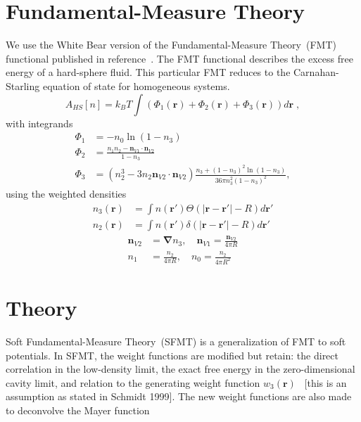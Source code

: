 \documentclass[letterpaper,twocolumn,amsmath,amssymb,prb]{revtex4-1}
\newcommand{\red}[1]{{\color{red} #1}}
\newcommand{\rr}{\textbf{r}}
\newcommand{\fixme}[1]{\red{[#1]}}
\begin{document}
\section{Fundamental-Measure Theory}

We use the White Bear version of the Fundamental-Measure Theory~(FMT)
functional published in reference~\cite{roth2002whitebear}.  The FMT
functional describes the excess free energy of a hard-sphere fluid.
This particular FMT reduces to the Carnahan-Starling equation of state
for homogeneous systems.
\begin{equation}
A_\textit{HS}[n] = k_B T \int \left(\Phi_1(\rr) + \Phi_2(\rr) + \Phi_3(\rr)\right) d\rr \; ,
\end{equation}
with integrands
\begin{align}
\Phi_1 &= -n_0 \ln\left( 1 - n_3\right)\\
\Phi_2 &= \frac{n_1 n_2 - \mathbf{n}_{V1} \cdot\mathbf{n}_{V2}}{1-n_3} \\
\Phi_3 &= (n_2^3 - 3 n_2 \mathbf{n}_{V2} \cdot \mathbf{n}_{V2}) \frac{
  n_3 + (1-n_3)^2 \ln(1-n_3)
}{
  36\pi n_3^2\left( 1 - n_3 \right)^2
} ,
\end{align}
using the weighted densities
\begin{align}
  n_3(\rr) &= \int n(\rr') \Theta(\left|\rr - \rr'\right| - R) d\rr' \\
  n_2(\rr) &= \int n(\rr') \delta(\left|\rr - \rr'\right| - R) d\rr'
\end{align}
\begin{align}
  \mathbf{n}_{V2} &= \mathbf{\nabla} n_3 , \quad
  \mathbf{n}_{V1} = \frac{\mathbf{n}_{V2}}{4\pi R} \\
  n_1 &= \frac{n_2}{4\pi R} , \quad
  n_0 = \frac{n_2}{4\pi R^2}
\end{align}

\section{Theory}

Soft Fundamental-Measure Theory~(SFMT) is a generalization of FMT to
soft potentials. In SFMT, the weight functions are modified but retain:
the direct correlation in the low-density limit, the exact free energy
in the zero-dimensional cavity limit, and relation to the generating
weight function $w_3(\rr)$~\cite{schmidt1999density} \fixme{this is an assumption
  as stated in Schmidt 1999}.  The new weight functions are also made
to deconvolve the Mayer function   
\end{document}
